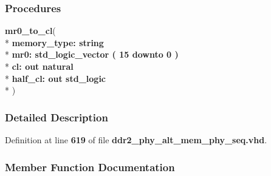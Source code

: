 \subsubsection*{Procedures}
 \begin{DoxyCompactItemize}
\item 
{\bfseries {\bfseries \textcolor{vhdlchar}{ }}} {\bf mr0\+\_\+to\+\_\+cl}( \\*
{\bfseries \textcolor{vhdlchar}{ }\textcolor{vhdlchar}{memory\+\_\+type\+: }\textcolor{stringliteral}{} {\bfseries \textcolor{comment}{string}\textcolor{vhdlchar}{ }}}\\*
  {\bfseries \textcolor{vhdlchar}{ }\textcolor{vhdlchar}{mr0\+: }\textcolor{stringliteral}{} {\bfseries \textcolor{comment}{std\+\_\+logic\+\_\+vector}\textcolor{vhdlchar}{ }\textcolor{vhdlchar}{(}\textcolor{vhdlchar}{ }\textcolor{vhdlchar}{ } \textcolor{vhdldigit}{15} \textcolor{vhdlchar}{ }\textcolor{keywordflow}{downto}\textcolor{vhdlchar}{ }\textcolor{vhdlchar}{ } \textcolor{vhdldigit}{0} \textcolor{vhdlchar}{ }\textcolor{vhdlchar}{)}\textcolor{vhdlchar}{ }}}\\*
  {\bfseries \textcolor{vhdlchar}{ }\textcolor{vhdlchar}{cl\+: }\textcolor{stringliteral}{} {\bfseries \textcolor{keywordflow}{out}\textcolor{vhdlchar}{ }\textcolor{comment}{natural}\textcolor{vhdlchar}{ }}}\\*
  {\bfseries \textcolor{vhdlchar}{ }\textcolor{vhdlchar}{half\+\_\+cl\+: }\textcolor{stringliteral}{} {\bfseries \textcolor{keywordflow}{out}\textcolor{vhdlchar}{ }\textcolor{comment}{std\+\_\+logic}\textcolor{vhdlchar}{ }}}\\*
   )
\end{DoxyCompactItemize}


\subsubsection{Detailed Description}


Definition at line {\bf 619} of file {\bf ddr2\+\_\+phy\+\_\+alt\+\_\+mem\+\_\+phy\+\_\+seq.\+vhd}.



\subsubsection{Member Function Documentation}
